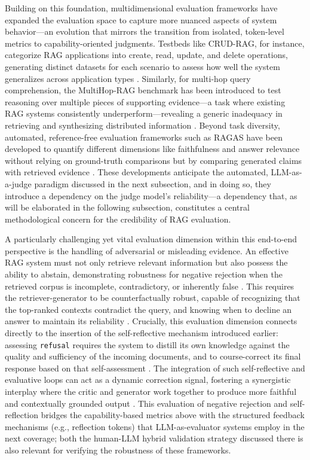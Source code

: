 \documentclass[11pt,a4paper]{article}
\begin{document}
Building on this foundation, multidimensional evaluation frameworks have expanded the evaluation space to capture more nuanced aspects of system behavior---an evolution that mirrors the transition from isolated, token-level metrics to capability-oriented judgments. Testbeds like CRUD-RAG, for instance, categorize RAG applications into create, read, update, and delete operations, generating distinct datasets for each scenario to assess how well the system generalizes across application types \cite{arxiv:2401.17043v2}. Similarly, for multi-hop query comprehension, the MultiHop-RAG benchmark has been introduced to test reasoning over multiple pieces of supporting evidence---a task where existing RAG systems consistently underperform---revealing a generic inadequacy in retrieving and synthesizing distributed information \cite{arxiv:2401.15391v1}. Beyond task diversity, automated, reference-free evaluation frameworks such as RAGAS have been developed to quantify different dimensions like faithfulness and answer relevance without relying on ground-truth comparisons but by comparing generated claims with retrieved evidence \cite{arxiv:2309.15217v1}. These developments anticipate the automated, LLM-as-a-judge paradigm discussed in the next subsection, and in doing so, they introduce a dependency on the judge model's reliability---a dependency that, as will be elaborated in the following subsection, constitutes a central methodological concern for the credibility of RAG evaluation.

A particularly challenging yet vital evaluation dimension within this end-to-end perspective is the handling of adversarial or misleading evidence. An effective RAG system must not only retrieve relevant information but also possess the ability to abstain, demonstrating robustness for negative rejection when the retrieved corpus is incomplete, contradictory, or inherently false \cite{arxiv:2309.01431v2}. This requires the retriever-generator to be counterfactually robust, capable of recognizing that the top-ranked contexts contradict the query, and knowing when to decline an answer to maintain its reliability \cite{arxiv:2405.07437v2,arxiv:2405.20978v1}. Crucially, this evaluation dimension connects directly to the insertion of the self-reflective mechanism introduced earlier: assessing \texttt{refusal} requires the system to distill its own knowledge against the quality and sufficiency of the incoming documents, and to course-correct its final response based on that self-assessment \cite{arxiv:2310.11511v1}. The integration of such self-reflective and evaluative loops can act as a dynamic correction signal, fostering a synergistic interplay where the critic and generator work together to produce more faithful and contextually grounded output \cite{arxiv:2312.10997v5}. This evaluation of negative rejection and self-reflection bridges the capability-based metrics above with the structured feedback mechanisms (e.g., reflection tokens) that LLM-as-evaluator systems employ in the next coverage; both the human-LLM hybrid validation strategy discussed there is also relevant for verifying the robustness of these frameworks.
\end{document}
